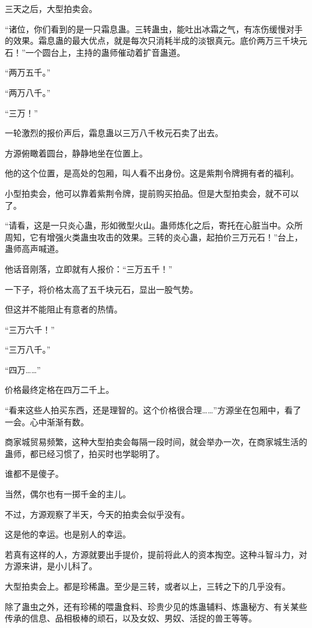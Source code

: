 \begin{this_body}
三天之后，大型拍卖会。

“诸位，你们看到的是一只霜息蛊。三转蛊虫，能吐出冰霜之气，有冻伤缓慢对手的效果。霜息蛊的最大优点，就是每次只消耗半成的淡银真元。底价两万三千块元石！”一个圆台上，主持的蛊师催动着扩音蛊道。

“两万五千。”

“两万八千。”

“三万！”

一轮激烈的报价声后，霜息蛊以三万八千枚元石卖了出去。

方源俯瞰着圆台，静静地坐在位置上。

他的这个位置，是高处的包厢，叫人看不出身份。这是紫荆令牌拥有者的福利。

小型拍卖会，他可以靠着紫荆令牌，提前购买拍品。但是大型拍卖会，就不可以了。

“请看，这是一只炎心蛊，形如微型火山。蛊师炼化之后，寄托在心脏当中。众所周知，它有增强火类蛊虫攻击的效果。三转的炎心蛊，起拍价三万元石！”台上，蛊师高声喊道。

他话音刚落，立即就有人报价：“三万五千！”

一下子，将价格太高了五千块元石，显出一股气势。

但这并不能阻止有意者的热情。

“三万六千！”

“三万八千。”

“四万……”

价格最终定格在四万二千上。

“看来这些人拍买东西，还是理智的。这个价格很合理……”方源坐在包厢中，看了一会。心中渐渐有数。

商家城贸易频繁，这种大型拍卖会每隔一段时间，就会举办一次，在商家城生活的蛊师，都已经习惯了，拍买时也学聪明了。

谁都不是傻子。

当然，偶尔也有一掷千金的主儿。

不过，方源观察了半天，今天的拍卖会似乎没有。

这是他的幸运。也是别人的幸运。

若真有这样的人，方源就要出手提价，提前将此人的资本掏空。这种斗智斗力，对方源来讲，是小儿科了。

大型拍卖会上。都是珍稀蛊。至少是三转，或者以上，三转之下的几乎没有。

除了蛊虫之外，还有珍稀的喂蛊食料、珍贵少见的炼蛊辅料、炼蛊秘方、有关某些传承的信息、品相极棒的顽石，以及女奴、男奴、活捉的兽王等等。


\end{this_body}
